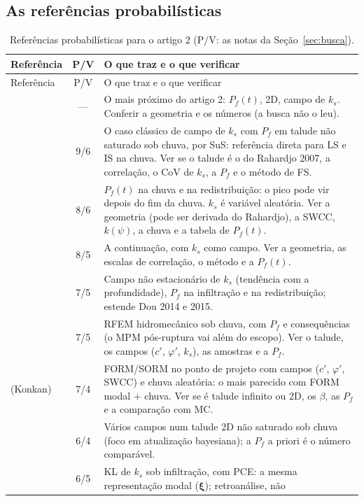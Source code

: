 \documentclass[11pt,a4paper]{article}
\begin{document}
\subsection{As referências probabilísticas}
{\small\setlength{\tabcolsep}{4pt}
\begin{longtable}{L{3.3cm}cL{11.6cm}}
\caption{Referências probabilísticas para o artigo 2 (P/V: as notas da Seção~\ref{sec:busca}).}\label{tab:chuvaprob}\\
\toprule
Referência & P/V & O que traz e o que verificar \\
\midrule\endfirsthead
\toprule Referência & P/V & O que traz e o que verificar \\ \midrule\endhead
\bottomrule\endlastfoot
\citet{cho2014} & --- & O mais próximo do artigo 2: $P_f(t)$, 2D, campo de $k_s$. Conferir a geometria e os números (a
  busca não o leu). \\
\citet{santoso2011} & 9/6 & O caso clássico de campo de $k_s$ com $P_f$ em talude não saturado sob chuva, por SuS:
  referência direta para LS e IS na chuva. Ver se o talude é o do Rahardjo 2007, a correlação, o CoV de $k_s$, a $P_f$
  e o método de FS. \\
\citet{dou2014} & 8/6 & $P_f(t)$ na chuva e na redistribuição: o pico pode vir depois do fim da chuva. $k_s$ é
  variável aleatória. Ver a geometria (pode ser derivada do Rahardjo), a SWCC, $k(\psi)$, a chuva e a tabela de
  $P_f(t)$. \\
\citet{dou2015} & 8/5 & A continuação, com $k_s$ como campo. Ver a geometria, as escalas de correlação, o método e a
  $P_f(t)$. \\
\citet{li2023} & 7/5 & Campo não estacionário de $k_s$ (tendência com a profundidade), $P_f$ na infiltração e na
  redistribuição; estende Dou 2014 e 2015. \\
\citet{liuwang2021} & 7/5 & RFEM hidromecânico sob chuva, com $P_f$ e consequências (o MPM pós-ruptura vai além do
  escopo). Ver o talude, os campos ($c'$, $\varphi'$, $k_s$), as amostras e a $P_f$. \\
\citet{raghuram2024} (Konkan) & 7/4 & FORM/SORM no ponto de projeto com campos ($c'$, $\varphi'$, SWCC) e chuva
  aleatória: o mais parecido com FORM modal + chuva. Ver se é talude infinito ou 2D, os $\beta$, as $P_f$ e a
  comparação com MC. \\
\citet{pan2023} & 6/4 & Vários campos num talude 2D não saturado sob chuva (foco em atualização bayesiana); a $P_f$ a
  priori é o número comparável. \\
\citet{yang2018} & 6/5 & KL de $k_s$ sob infiltração, com PCE: a mesma representação modal ($\bm\xi$); retroanálise, não

\end{longtable}}
\end{document}
